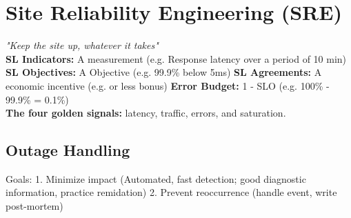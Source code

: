 \section{Site Reliability Engineering (SRE)}
\textit{"Keep the site up, whatever it takes"} \\
\textbf{SL Indicators:} A measurement (e.g. Response latency over a period of 10 min)
\textbf{SL Objectives:} A Objective (e.g. 99.9\% below 5ms)
\textbf{SL Agreements:} A economic incentive (e.g. or less bonus)
\textbf{Error Budget:} 1 - SLO (e.g. 100\% - 99.9\% = 0.1\%) \\

\textbf{The four golden signals: } latency, traffic, errors, and saturation.

\subsection{Outage Handling}
Goals: 1. Minimize impact (Automated, fast detection; good diagnostic information, practice remidation) 2. Prevent reoccurrence (handle event, write post-mortem)
